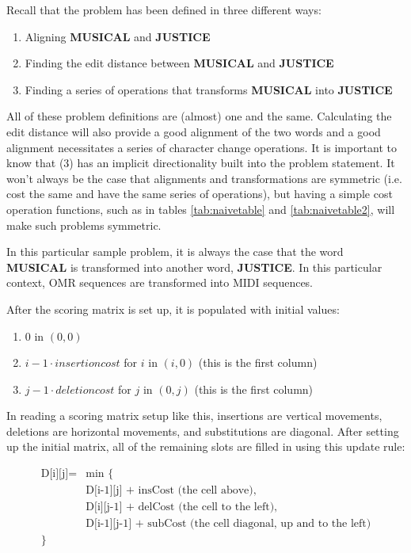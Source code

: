 Recall that the problem has been defined in three different ways:
\begin{enumerate}
\item Aligning \textbf{MUSICAL} and \textbf{JUSTICE}
\item Finding the edit distance between \textbf{MUSICAL} and \textbf{JUSTICE}
\item Finding a series of operations that transforms \textbf{MUSICAL} into \textbf{JUSTICE}
\end{enumerate}

All of these problem definitions are (almost) one and the same. Calculating the edit distance will also provide a good alignment of the two words and a good alignment necessitates a series of character change operations. It is important to know that (3) has an implicit directionality built into the problem statement. It won't always be the case that alignments and transformations are symmetric (i.e. cost the same and have the same series of operations), but having a simple cost operation functions, such as in tables \ref{tab:naivetable} and \ref{tab:naivetable2}, will make such problems symmetric. 

In this particular sample problem, it is always the case that the word \textbf{MUSICAL} is  transformed into another word, \textbf{JUSTICE}. In this particular context, OMR sequences are transformed into MIDI sequences. 

After the scoring matrix is set up, it is populated with initial values: 
\begin{enumerate}
\item 0 in $(0,0)$
\item $i-1 \cdot insertion cost$ for $i$ in $(i, 0)$ (this is the first column) 
\item $j-1 \cdot deletion cost$ for $j$ in $(0, j)$ (this is the first column) 
\end{enumerate}
In reading a scoring matrix setup like this, insertions are vertical movements, deletions are horizontal movements, and substitutions are diagonal. 
After setting up the initial matrix, all of the remaining slots are filled in using this update rule:


\begin{equation*}
\begin{split}
\text{D[i][j]} = &  \text{min \{ }\\
& \text{D[i-1][j] + insCost (the cell above),} \\
& \text{D[i][j-1] + delCost (the cell to the left),} \\
& \text{D[i-1][j-1] + subCost (the cell diagonal, up and to the left)} \\
\text{\}}
\end{split}
\end{equation*}


